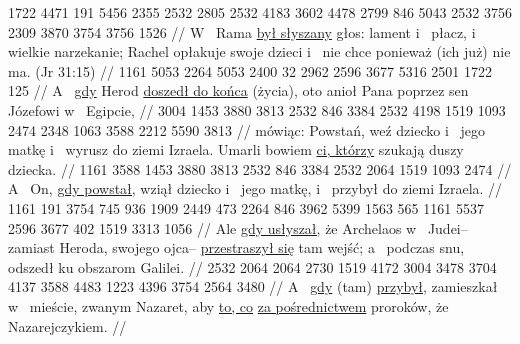 \begingl
\gla
{} 1722 4471 191 5456 2355 2532 2805 2532 4183 3602 4478 2799 846 5043 2532 3756 2309 3870 3754 {} 3756 1526 {}
//
\glb
{} W~ Rama \underline{był słyszany} głos: lament i~ płacz, i~ wielkie narzekanie; Rachel opłakuje swoje dzieci i~ nie chce  ponieważ (ich już) nie ma. (Jr 31:15)
//
\endgl
\begingl
\gla
{} 1161 5053 2264 5053 {} 2400 32 2962 2596 3677 5316 2501 1722 125
//
\glb
{} A~ \underline{gdy} Herod \underline{doszedł do końca} (życia), oto anioł Pana poprzez sen  Józefowi w~ Egipcie,
//
\endgl
\begingl
\gla
{} 3004 1453 3880 3813 2532 846 3384 2532 4198 1519 1093 2474 2348 1063 3588 2212 5590 3813
//
\glb
{} mówiąc: Powstań, weź dziecko i~ jego matkę i~ wyrusz do ziemi Izraela. Umarli bowiem \underline{ci, którzy} szukają duszy dziecka.
//
\endgl
\begingl
\gla
{} 1161 3588 1453 3880 3813 2532 846 3384 2532 2064 1519 1093 2474
//
\glb
{} A~ On, \underline{gdy powstał,} wziął dziecko i~ jego matkę, i~ przybył do ziemi Izraela.
//
\endgl
\begingl
\gla
{} 1161 191 3754 745 936 1909 2449 473 2264 846 3962 5399 1563 565 1161 5537 2596 3677 402 1519 3313 1056
//
\glb
{} Ale \underline{gdy usłyszał,} że Archelaos  w~ Judei– zamiast Heroda, swojego ojca– \underline{przestraszył się} tam wejść; a~  podczas snu, odszedł ku obszarom Galilei.
//
\endgl
\begingl
\gla
{} 2532 2064 {} 2064 2730 1519 4172 3004 3478 3704 4137 3588 4483 1223 4396 3754 2564 3480
//
\glb
{} A~ \underline{gdy} (tam) \underline{przybył,} zamieszkał w~ mieście, zwanym Nazaret, aby  \underline{to, co}  \underline{za pośrednictwem} proroków, że  Nazarejczykiem.
//
\endgl

